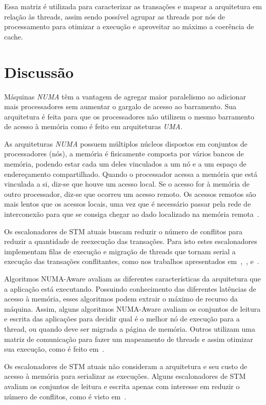 \documentclass[diss,capa]{texufpel}
\begin{document}
Essa matriz é utilizada para caracterizar as transações e mapear a arquitetura em relação às threads, assim sendo possível agrupar as threads por nós de processamento para otimizar a execução e aproveitar ao máximo a coerência de cache.

\section{Discussão}

Máquinas \emph{NUMA} têm a vantagem de agregar maior paralelismo ao adicionar mais processadores sem aumentar o gargalo de acesso ao barramento. Sua arquitetura é feita para que os processadores não utilizem o mesmo barramento de acesso à memória como é feito em arquiteturas \emph{UMA}.

As arquiteturas \emph{NUMA} possuem múltiplos núcleos dispostos em conjuntos de processadores (nós), a memória é fisicamente composta por vários bancos de memória, podendo estar cada um deles vinculados a um nó e a um espaço de endereçamento compartilhado. Quando o processador acessa a memória que está vinculada a si, diz-se que houve um acesso local. Se o acesso for à memória de outro processador, diz-se que ocorreu um acesso remoto. Os acessos remotos são mais lentos que os acessos locais, uma vez que é necessário passar pela rede de interconexão para que se consiga chegar ao dado localizado na memória remota~\cite{Rodolfo:2014}.

Os escalonadores de STM atuais buscam reduzir o número de conflitos para reduzir a quantidade de reexecução das transações. Para isto estes escalonadores implementam filas de execução e migração de threads que tornam serial a execução das transações conflitantes, como nos trabalhos apresentados em~\cite{shrink2009},~\cite{Nicacio2012}, e~\cite{rito2015}.

Algoritmos NUMA-Aware avaliam as diferentes características da arquitetura que a aplicação está executando. Possuindo conhecimento das diferentes latências de acesso à memória, esses algoritmos podem extrair o máximo de recurso da máquina. Assim, alguns algoritmos NUMA-Aware avaliam os conjuntos de leitura e escrita das aplicações para decidir qual é o melhor nó de execução para a thread, ou quando deve ser migrada a página de memória. Outros utilizam uma matriz de comunicação para fazer um mapeamento de threads e assim otimizar sua execução, como é feito em~\cite{pasqualin2020thread}.

Os escalonadores de STM atuais não consideram a arquitetura e seu custo de acesso à memória para serializar as execuções. Alguns escalonadores de STM avaliam os conjuntos de leitura e escrita apenas com interesse em reduzir o número de conflitos, como é visto em~\cite{shrink2009}.
\end{document}
